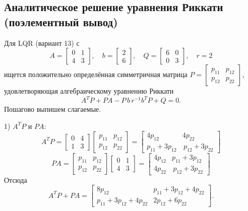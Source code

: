 \subsection{Аналитическое решение уравнения Риккати (поэлементный вывод)}
Для LQR (вариант 13) с
\[
 A=\begin{bmatrix}0&1\\4&3\end{bmatrix},\quad b=\begin{bmatrix}2\\6\end{bmatrix},\quad Q=\begin{bmatrix}6&0\\0&3\end{bmatrix},\quad r=2
\]
ищется положительно определённая симметричная матрица \(P=\begin{bmatrix}p_{11}&p_{12}\\p_{12}&p_{22}\end{bmatrix}\), удовлетворяющая алгебраическому уравнению Риккати
\[
 A^T P + P A - P\,b\,r^{-1}b^T P + Q = 0.
\]
Пошагово выпишем слагаемые.

1) \(A^T P\) и \(P A\):
\[
 A^T P = \begin{bmatrix}0&4\\1&3\end{bmatrix}\!\begin{bmatrix}p_{11}&p_{12}\\p_{12}&p_{22}\end{bmatrix}=
 \begin{bmatrix}4p_{12}&4p_{22}\\ p_{11}+3p_{12}&\,p_{12}+3p_{22}\end{bmatrix}
\]
\[
 P A = \begin{bmatrix}p_{11}&p_{12}\\p_{12}&p_{22}\end{bmatrix}\!\begin{bmatrix}0&1\\4&3\end{bmatrix}=\begin{bmatrix}4p_{12}&p_{11}+3p_{12}\\ 4p_{22}&\,p_{12}+3p_{22}\end{bmatrix}
\]
Отсюда
\[
 A^T P + P A = \begin{bmatrix}
 8p_{12} & p_{11}+3p_{12}+4p_{22}\\[2pt]
 p_{11}+3p_{12}+4p_{22} & 2p_{12}+6p_{22}
 \end{bmatrix}.
\]

